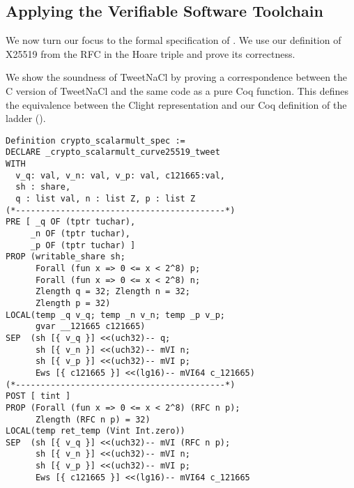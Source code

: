 \subsection{Applying the Verifiable Software Toolchain}
\label{subsec:with-VST}

\begin{sloppypar}
We now turn our focus to the formal specification of .
We use our definition of X25519 from the RFC in the Hoare triple and prove
its correctness.
\end{sloppypar}

We show the soundness of TweetNaCl by proving a correspondence between
the C version of TweetNaCl and the same code as a pure Coq function.
This defines the equivalence between the Clight representation and our Coq
definition of the ladder ().

\begin{lstlisting}[language=CoqVST]
Definition crypto_scalarmult_spec :=
DECLARE _crypto_scalarmult_curve25519_tweet
WITH
  v_q: val, v_n: val, v_p: val, c121665:val,
  sh : share,
  q : list val, n : list Z, p : list Z
(*------------------------------------------*)
PRE [ _q OF (tptr tuchar),
     _n OF (tptr tuchar),
     _p OF (tptr tuchar) ]
PROP (writable_share sh;
      Forall (fun x => 0 <= x < 2^8) p;
      Forall (fun x => 0 <= x < 2^8) n;
      Zlength q = 32; Zlength n = 32;
      Zlength p = 32)
LOCAL(temp _q v_q; temp _n v_n; temp _p v_p;
      gvar __121665 c121665)
SEP  (sh [{ v_q }] <<(uch32)-- q;
      sh [{ v_n }] <<(uch32)-- mVI n;
      sh [{ v_p }] <<(uch32)-- mVI p;
      Ews [{ c121665 }] <<(lg16)-- mVI64 c_121665)
(*------------------------------------------*)
POST [ tint ]
PROP (Forall (fun x => 0 <= x < 2^8) (RFC n p);
      Zlength (RFC n p) = 32)
LOCAL(temp ret_temp (Vint Int.zero))
SEP  (sh [{ v_q }] <<(uch32)-- mVI (RFC n p);
      sh [{ v_n }] <<(uch32)-- mVI n;
      sh [{ v_p }] <<(uch32)-- mVI p;
      Ews [{ c121665 }] <<(lg16)-- mVI64 c_121665
\end{lstlisting}

